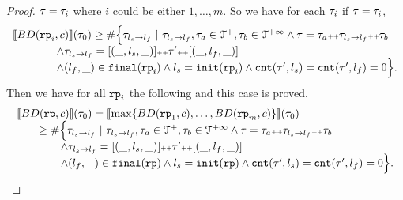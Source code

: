 \begin{proof}
$\mathtt{\tau} = \mathtt{\tau}_i$ where $i$ could be either $1, \ldots, m$.
So we have for each $\mathtt{\tau}_i$ if $\mathtt{\tau} = \mathtt{\tau}_i$, 
\[
  \begin{array}{l}
    \llbracket BD(\mathtt{rp}_i, c) \rrbracket(\mathtt{\tau}_0) \geq
    \# \Big\{\mathtt{\tau}_{l_s \to l_f} ~\vert~ \mathtt{\tau}_{l_s \to l_f}, \mathtt{\tau}_a \in \mathcal{T}^{+}, \mathtt{\tau}_b \in \mathcal{T}^{+\infty}
    \land \mathtt{\tau} = \mathtt{\tau}_a {\scriptscriptstyle ++} \mathtt{\tau}_{l_s \to l_f} {\scriptscriptstyle ++} \mathtt{\tau}_b
    \\ \qquad \qquad
    \land \mathtt{\tau}_{l_s \to l_f} = [(\_, l_s, \_)] {\scriptscriptstyle ++} \mathtt{\tau}' {\scriptscriptstyle ++} [(\_, l_f, \_)]
    \\ \qquad \qquad
    \land (l_{f}, \_) \in \mathtt{final}(\mathtt{rp}_i)
    \land l_s = \mathtt{init}(\mathtt{rp}_i)
    \land \mathtt{cnt}(\mathtt{\tau}', l_s) = \mathtt{cnt}(\mathtt{\tau}', l_f) = 0 
    \Big\}.
      \end{array}
\]
Then we have for all $\mathtt{rp}_i$ the following and this case is proved.
\[
  \begin{array}{l}
    \econfig{BD(\rprog, c)}(\trace_0) = 
    \econfig{ \max\left\{ BD(\rprog_1, c), \ldots, BD(\rprog_m, c) \right\}}(\trace_0)
    \\ \qquad 
    \geq
    \# \Big\{\trace_{l_s \to l_f} ~\vert~ \trace_{l_s \to l_f}, \trace_a \in \ftdom, \trace_b \in \tdom
    \land \trace = \trace_a \tracecat \trace_{l_s \to l_f} \tracecat \trace_b
    \\ \qquad \qquad
    \land \trace_{l_s \to l_f} = [(\_, l_s, \_)] \tracecat \trace' \tracecat [(\_, l_f, \_)]
    \\ \qquad \qquad
    \land (l_{f}, \_) \in \absfinal(\rprog)
    \land l_s = \absinit(\rprog)
    \land \counter(\trace', l_s) = \counter(\trace', l_f) = 0 
    \Big\}.
      \end{array}
\]


\end{proof}
